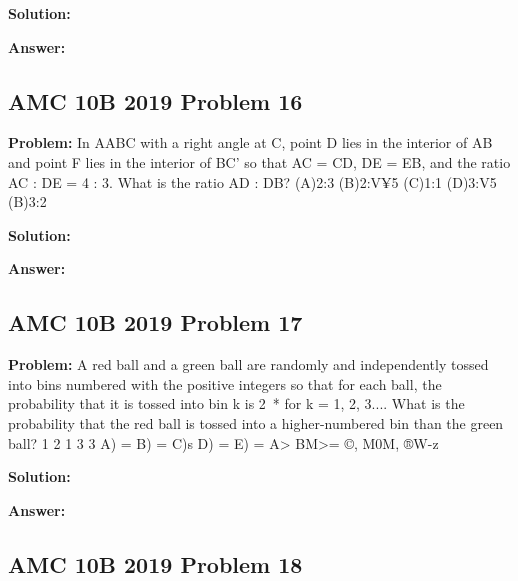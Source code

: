 \documentclass{article}
\newenvironment{problem}{\textbf{Problem: }}{\\}
\newenvironment{solution}{\textbf{Solution: }}{\\}
\newenvironment{answer}{\textbf{Answer: }}{\\}
\begin{document}
\begin{solution}
\end{solution}

\begin{answer}
\end{answer}

\subsection{AMC 10B 2019 Problem 16}

\begin{problem}
In AABC with a right angle at C, point D lies in the interior of AB and point F lies in the interior of BC’ so that AC = CD, DE = EB, and the ratio AC : DE = 4 : 3. What is the ratio AD : DB? (A)2:3 (B)2:V¥5 (C)1:1 (D)3:V5 (B)3:2
\end{problem}

\begin{solution}
\end{solution}

\begin{answer}
\end{answer}

\subsection{AMC 10B 2019 Problem 17}

\begin{problem}
A red ball and a green ball are randomly and independently tossed into bins numbered with the positive integers so that for each ball, the probability that it is tossed into bin k is 2~* for k = 1, 2, 3.... What is the probability that the red ball is tossed into a higher-numbered bin than the green ball? 1 2 1 3 3 A) = B) = C)s D) = E) = A> BM>= ©, M0M, ®W-z
\end{problem}

\begin{solution}
\end{solution}

\begin{answer}
\end{answer}

\subsection{AMC 10B 2019 Problem 18}
\end{document}
